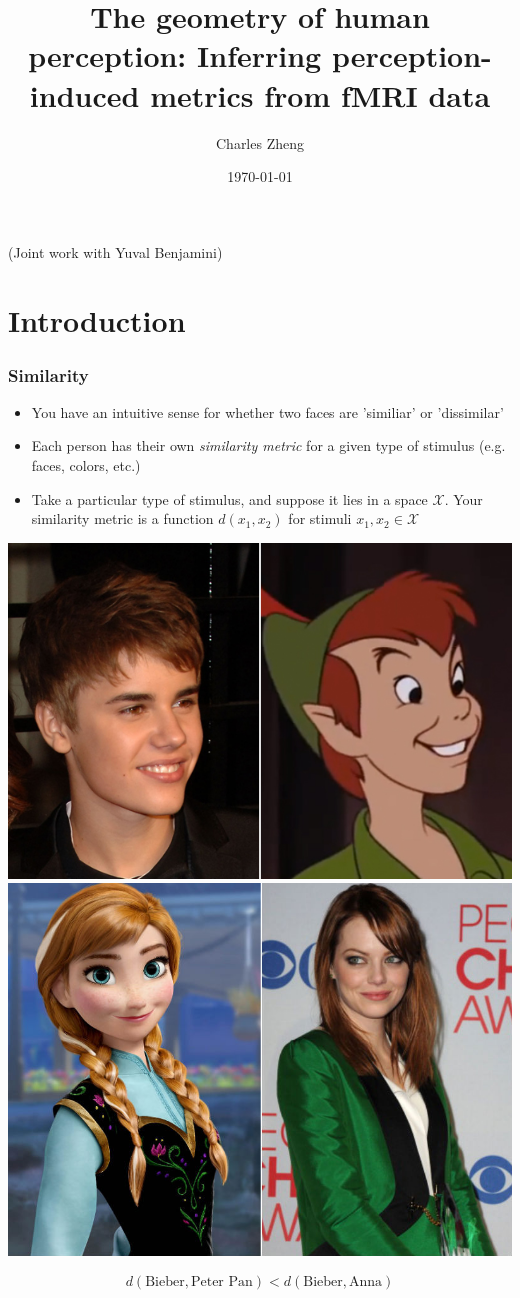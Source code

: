 \documentclass{beamer}
\title[Group talk]{The geometry of human perception: Inferring perception-induced metrics from fMRI data}
\author{Charles Zheng} %
\institute[Stanford] %
{Stanford University}
\date{\today} %
\begin{document}
\begin{frame}
\titlepage %
(Joint work with Yuval Benjamini)
\end{frame}

\section{Introduction}

\begin{frame}
\frametitle{Similarity}
\begin{itemize}
\item You have an intuitive sense for whether two faces are 'similiar' or 'dissimilar'
\item Each person has their own \emph{similarity metric} for a given type of stimulus (e.g. faces, colors, etc.)
\item Take a particular type of stimulus, and suppose it lies in a space $\mathcal{X}$.  Your similarity metric is a function $d(x_1, x_2)$ for stimuli $x_1, x_2 \in \mathcal{X}$
\end{itemize}
\begin{center}
\includegraphics[scale = .12]{bieber.jpg}\hspace{1in}
\includegraphics[scale = .12]{stone.jpg}
\end{center}
\[
d(\text{Bieber},\text{Peter Pan}) < d(\text{Bieber}, \text{Anna})
\]
\end{frame}
\end{document}
